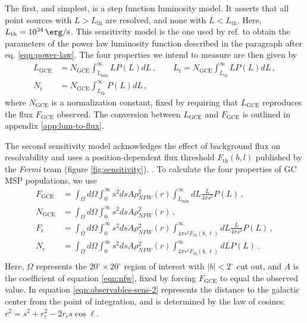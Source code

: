 \documentclass[a4paper,11pt]{article}
\newcommand{\comment}[1]{\emph{\color{red}{#1}}}
\begin{document}
The first, and simplest, is a step function luminosity model. It asserts that all point sources with $L>L_\text{th}$ are resolved, and none with $L<L_{\text{th}}$. Here, $L_\text{th} = \SI{e34}{\erg\per\second}$. This sensitivity model is the one used by ref. \cite{Zhong:2019ycb} to obtain the parameters of the power law luminosity function described in the paragraph after eq. \ref{eqn:power-law}. The four properties we intend to measure are then given by
\begin{equation}
    \begin{split}
        L_\text{GCE} &= N_\text{GCE}\int_{L_\text{min}}^\infty L P(L) dL \,, \qquad
        L_\text{r} = N_\text{GCE}\int_{L_\text{th}}^\infty L P(L) dL \,, \\
        N_\text{r} &= N_\text{GCE}\int_{L_\text{th}}^\infty P(L) dL \,,
        \label{eqn:observables-sens-1}
    \end{split}
\end{equation}
where $N_\text{GCE}$ is a normalization constant, fixed by requiring that $L_\text{GCE}$ reproduces the flux $F_\text{GCE}$ observed. The conversion between $L_\text{GCE}$ and $F_\text{GCE}$ is outlined in appendix \ref{app:lum-to-flux}.

The second sensitivity model acknowledges the effect of background flux on resolvability and uses a position-dependent flux threshold $F_\text{th}(b, l)$ published by the \textit{Fermi} team \cite{Fermi-LAT:2019yla, Ballet:2020hze} (figure \ref{fig:sensitivity}). \comment{Here, I could talk about how to convert between flux and luminosity and then use the mean of this map to assess how accurate 1e34 ergs/s actually is.}. To calculate the four properties of GC MSP populations, we use
\begin{equation}
    \begin{split}
        F_\text{GCE} &= \int_\Omega d\Omega \int_0^\infty s^2 ds A \rho_{NFW}^2(r)\int_{L_\text{min}}^\infty dL \frac{L}{4\pi s^2}P(L)\,, \\
        N_\text{GCE} &= \int_\Omega d\Omega \int_0^\infty s^2 ds A \rho_{NFW}^2(r)\,, \\
        F_\text{r} &= \int_\Omega d\Omega \int_0^\infty s^2 ds A \rho_{NFW}^2(r)\int_{4\pi s^2F_\text{th}(b,\ell)}^\infty dL \frac{L}{4\pi s^2}P(L)\,, \\
        N_\text{r} &= \int_\Omega d\Omega \int_0^\infty s^2 ds A \rho_{NFW}^2(r)\int_{4\pi s^2F_\text{th}(b,\ell)}^\infty dL P(L) \,. \\
        \label{eqn:observables-sens-2}
    \end{split}
\end{equation}
Here, $\Omega$ represents the $20^\circ \times 20^\circ$ region of interest with $|b| < 2^\circ$ cut out, and $A$ is the coefficient of equation \ref{eqn:nfw}, fixed by forcing $F_\text{GCE}$ to equal the observed value. In equation \ref{eqn:observables-sens-2} represents the distance to the galactic center from the point of integration, and is determined by the law of cosines:
$r^2 = s^2 + r_c^2 - 2r_c s \cos \ell$.
\end{document}
